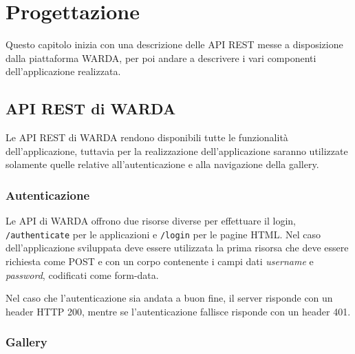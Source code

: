 
\chapter{Progettazione}
\label{cap:progettazione}


Questo capitolo inizia con una descrizione delle API REST messe a disposizione dalla piattaforma WARDA, per poi andare a descrivere i vari componenti dell'applicazione realizzata.


\section{API REST di WARDA}

Le API REST di WARDA rendono disponibili tutte le funzionalità dell'applicazione, tuttavia per la realizzazione dell'applicazione saranno utilizzate solamente quelle relative all'autenticazione e alla navigazione della gallery.

\subsection{Autenticazione}

Le API di WARDA offrono due risorse diverse per effettuare il login, \texttt{/authenticate} per le applicazioni e \texttt{/login} per le pagine HTML.
Nel caso dell'applicazione sviluppata deve essere utilizzata la prima risorsa che deve essere richiesta come POST e con un corpo contenente i campi dati \textit{username} e \textit{password}, codificati come form-data.

Nel caso che l'autenticazione sia andata a buon fine, il server risponde con un header HTTP 200, mentre se l'autenticazione fallisce risponde con un header 401.

\subsection{Gallery}

